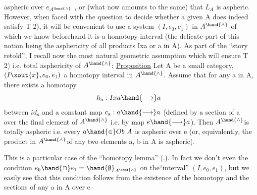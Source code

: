 
aspheric over $e_{A^{\hand{\wedge}}}$ ,  or (what now amounts to the same) that $L_A$ is aspheric.
However,  when faced with the question to decide whether a given A does
indeed  satisfy  T 2),  it will be convenient to use a 
system  $(I,e_0,e_1)$ in $A^{\hand{\wedge}}$ of which we know beforehand it is a homotopy
interval (the delicate part of this notion being the asphericity of all
products Ixa or a in A).   As part of the ``story retold'',  I recall
now the most natural geometric assumption which will ensure T 2)  i.e.
total  asphericity of $A^{\hand{\wedge}}$:
\uline{Proposition}   Let A be a small category,  $(I\xout{x},e_0,e_1)$ a homotopy interval
in $A^{\hand{\wedge}}$.  Assume that for any a in A,  there exists a homotopy
\[ h_a : Ixa \hand{\longrightarrow} a \]
between  $id_a$ and a constant map  $c_a : a \hand{\longrightarrow} a$  (defined by a section of a
over the final element of $A^{\hand{\wedge}}$ i.e. by   map $e \hand{\longrightarrow} a$).  Then $A^{\hand{\wedge}}$is
totally aspheric i.e. every $a \hand{\in} Ob\ A$ is aspheric over e  (or,  equivalently,
the product in $A^{\hand{\wedge}}$\hand{/}of any two elements a, b in A is aspheric).

This is a particular case of the ``homotopy lemma'' (\hand{\unsure{\S}}.).  In fact
we don't even the condition  $e_0 \hand{\cap} e_1 = \hand{\emptyset}_{A^{\hand{\wedge}}}$  on the``interval'' $(I,e_0,e_1)$,
but we easily see that this condition follows from the existence of the
homotopy and the sections of any a in A over e\hand{,} 

